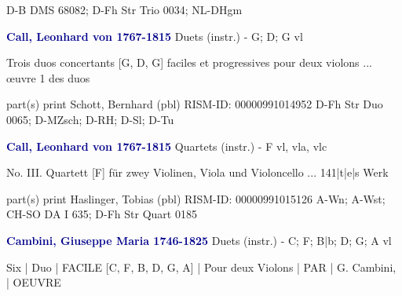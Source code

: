 \documentclass[twocolumn]{book}
\begin{document}
\newline D-B  DMS 68082; D-Fh  Str Trio 0034; NL-DHgm
\newline \par \vspace{7pt} \textcolor{darkblue}{\textbf{Call, Leonhard von  1767-1815}}
\newline Duets (instr.) - G; D; G
 vl
\newline \begin{itshape}Trois duos concertants [G, D, G] faciles et progressives pour deux violons ... œuvre 1 des duos\end{itshape} 
\newline \textcolor{darkblue}{}  part(s)
\newline print
\newline Schott, Bernhard  (pbl)
\newline RISM-ID: 00000991014952
\newline D-Fh  Str Duo 0065; D-MZsch; D-RH; D-Sl; D-Tu
\newline \par \vspace{7pt} \textcolor{darkblue}{\textbf{Call, Leonhard von  1767-1815}}
\newline Quartets (instr.) - F
 vl, vla, vlc
\newline \begin{itshape}No. III. Quartett [F] für zwey Violinen, Viola und Violoncello ... 141|t|e|s Werk\end{itshape} 
\newline \textcolor{darkblue}{}  part(s)
\newline print
\newline Haslinger, Tobias  (pbl)
\newline RISM-ID: 00000991015126
\newline A-Wn; A-Wst; CH-SO  DA I 635; D-Fh  Str Quart 0185
\newline \par \vspace{7pt} \textcolor{darkblue}{\textbf{Cambini, Giuseppe Maria  1746-1825}}
\newline Duets (instr.) - C; F; B|b; D; G; A
 vl
\newline \begin{itshape}Six | Duo | FACILE [C, F, B, D, G, A] | Pour deux Violons | PAR | G. Cambini, | OEUVRE\end{itshape} 
\end{document}
